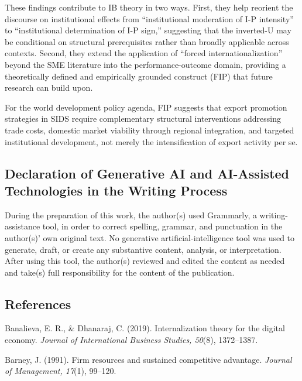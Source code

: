 \documentclass[
  12pt,a4paper]{article}
\begin{document}
These findings contribute to IB theory in two ways. First, they help
reorient the discourse on institutional effects from ``institutional
moderation of I-P intensity'' to ``institutional determination of I-P
sign,'' suggesting that the inverted-U may be conditional on structural
prerequisites rather than broadly applicable across contexts. Second,
they extend the application of ``forced internationalization'' beyond
the SME literature into the performance-outcome domain, providing a
theoretically defined and empirically grounded construct (FIP) that
future research can build upon.

For the world development policy agenda, FIP suggests that export
promotion strategies in SIDS require complementary structural
interventions addressing trade costs, domestic market viability through
regional integration, and targeted institutional development, not merely
the intensification of export activity per se.

\hypertarget{declaration-of-generative-ai-and-ai-assisted-technologies-in-the-writing-process}{%
\subsection{Declaration of Generative AI and AI-Assisted Technologies in
the Writing
Process}\label{declaration-of-generative-ai-and-ai-assisted-technologies-in-the-writing-process}}

During the preparation of this work, the author(s) used Grammarly, a
writing-assistance tool, in order to correct spelling, grammar, and
punctuation in the author(s)' own original text. No generative
artificial-intelligence tool was used to generate, draft, or create any
substantive content, analysis, or interpretation. After using this tool,
the author(s) reviewed and edited the content as needed and take(s) full
responsibility for the content of the publication.

\hypertarget{references}{%
\subsection{References}\label{references}}

Banalieva, E. R., \& Dhanaraj, C. (2019). Internalization theory for the
digital economy. \emph{Journal of International Business Studies,
50}(8), 1372--1387.

Barney, J. (1991). Firm resources and sustained competitive advantage.
\emph{Journal of Management, 17}(1), 99--120.
\end{document}
